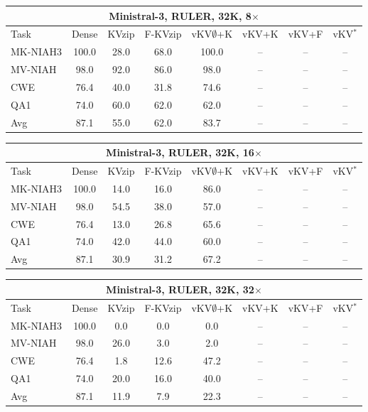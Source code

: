 \begin{tabular}{lccccccc}
\toprule
\multicolumn{8}{c}{Ministral-3, RULER, 32K, 8$\times$} \\
\midrule
Task & Dense & KVzip & F-KVzip & vKV$\emptyset$+K & vKV+K & vKV+F & vKV$^\ast$ \\
\midrule
MK-NIAH3 & 100.0 & 28.0 & 68.0 & 100.0 & -- & -- & -- \\
MV-NIAH & 98.0 & 92.0 & 86.0 & 98.0 & -- & -- & -- \\
CWE & 76.4 & 40.0 & 31.8 & 74.6 & -- & -- & -- \\
QA1 & 74.0 & 60.0 & 62.0 & 62.0 & -- & -- & -- \\
\midrule
Avg & 87.1 & 55.0 & 62.0 & 83.7 & -- & -- & -- \\
\bottomrule
\end{tabular}
\vspace{0.8em}

\begin{tabular}{lccccccc}
\toprule
\multicolumn{8}{c}{Ministral-3, RULER, 32K, 16$\times$} \\
\midrule
Task & Dense & KVzip & F-KVzip & vKV$\emptyset$+K & vKV+K & vKV+F & vKV$^\ast$ \\
\midrule
MK-NIAH3 & 100.0 & 14.0 & 16.0 & 86.0 & -- & -- & -- \\
MV-NIAH & 98.0 & 54.5 & 38.0 & 57.0 & -- & -- & -- \\
CWE & 76.4 & 13.0 & 26.8 & 65.6 & -- & -- & -- \\
QA1 & 74.0 & 42.0 & 44.0 & 60.0 & -- & -- & -- \\
\midrule
Avg & 87.1 & 30.9 & 31.2 & 67.2 & -- & -- & -- \\
\bottomrule
\end{tabular}
\vspace{0.8em}

\begin{tabular}{lccccccc}
\toprule
\multicolumn{8}{c}{Ministral-3, RULER, 32K, 32$\times$} \\
\midrule
Task & Dense & KVzip & F-KVzip & vKV$\emptyset$+K & vKV+K & vKV+F & vKV$^\ast$ \\
\midrule
MK-NIAH3 & 100.0 & 0.0 & 0.0 & 0.0 & -- & -- & -- \\
MV-NIAH & 98.0 & 26.0 & 3.0 & 2.0 & -- & -- & -- \\
CWE & 76.4 & 1.8 & 12.6 & 47.2 & -- & -- & -- \\
QA1 & 74.0 & 20.0 & 16.0 & 40.0 & -- & -- & -- \\
\midrule
Avg & 87.1 & 11.9 & 7.9 & 22.3 & -- & -- & -- \\
\bottomrule
\end{tabular}
\vspace{0.8em}

